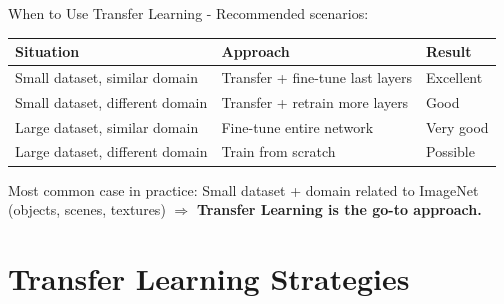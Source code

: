 \documentclass[aspectratio=169,xcolor=dvipsnames]{beamer}
\begin{document}
\begin{frame}{When to Use Transfer Learning - Recommended scenarios:}

    \begin{tabular}{lll}
        \toprule
        \textbf{Situation} & \textbf{Approach} & \textbf{Result} \\
        \midrule
        Small dataset, similar domain & Transfer + fine-tune last layers & Excellent \\
        Small dataset, different domain & Transfer + retrain more layers & Good \\
        Large dataset, similar domain & Fine-tune entire network & Very good \\
        Large dataset, different domain & Train from scratch & Possible \\
        \bottomrule
    \end{tabular}

    \begin{alertblock}{Most common case in practice:}
        Small dataset + domain related to ImageNet (objects, scenes, textures)
        $\Rightarrow$ \textbf{Transfer Learning is the go-to approach.}
    \end{alertblock}
\end{frame}

\section{Transfer Learning Strategies}
\end{document}
